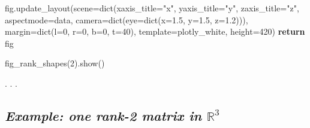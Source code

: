 \documentclass[
  letterpaper,
  DIV=11,
  numbers=noendperiod]{scrartcl}
\newenvironment{Shaded}{\begin{snugshade}}{\end{snugshade}}
\newcommand{\BuiltInTok}[1]{\textcolor[rgb]{0.00,0.23,0.31}{#1}}
\newcommand{\ControlFlowTok}[1]{\textcolor[rgb]{0.00,0.23,0.31}{\textbf{#1}}}
\newcommand{\DecValTok}[1]{\textcolor[rgb]{0.68,0.00,0.00}{#1}}
\newcommand{\FloatTok}[1]{\textcolor[rgb]{0.68,0.00,0.00}{#1}}
\newcommand{\NormalTok}[1]{\textcolor[rgb]{0.00,0.23,0.31}{#1}}
\newcommand{\OperatorTok}[1]{\textcolor[rgb]{0.37,0.37,0.37}{#1}}
\newcommand{\StringTok}[1]{\textcolor[rgb]{0.13,0.47,0.30}{#1}}
\begin{document}
\begin{Shaded}
\begin{Highlighting}[]
\NormalTok{    fig.update\_layout(scene}\OperatorTok{=}\BuiltInTok{dict}\NormalTok{(xaxis\_title}\OperatorTok{=}\StringTok{"x"}\NormalTok{, yaxis\_title}\OperatorTok{=}\StringTok{"y"}\NormalTok{, zaxis\_title}\OperatorTok{=}\StringTok{"z"}\NormalTok{,}
\NormalTok{                                 aspectmode}\OperatorTok{=}\StringTok{\textquotesingle{}data\textquotesingle{}}\NormalTok{, camera}\OperatorTok{=}\BuiltInTok{dict}\NormalTok{(eye}\OperatorTok{=}\BuiltInTok{dict}\NormalTok{(x}\OperatorTok{=}\FloatTok{1.5}\NormalTok{, y}\OperatorTok{=}\FloatTok{1.5}\NormalTok{, z}\OperatorTok{=}\FloatTok{1.2}\NormalTok{))),}
\NormalTok{                      margin}\OperatorTok{=}\BuiltInTok{dict}\NormalTok{(l}\OperatorTok{=}\DecValTok{0}\NormalTok{, r}\OperatorTok{=}\DecValTok{0}\NormalTok{, b}\OperatorTok{=}\DecValTok{0}\NormalTok{, t}\OperatorTok{=}\DecValTok{40}\NormalTok{), template}\OperatorTok{=}\StringTok{\textquotesingle{}plotly\_white\textquotesingle{}}\NormalTok{, height}\OperatorTok{=}\DecValTok{420}\NormalTok{)}
    \ControlFlowTok{return}\NormalTok{ fig}

\NormalTok{fig\_rank\_shapes(}\DecValTok{2}\NormalTok{).show()}
\end{Highlighting}
\end{Shaded}

\begin{figure}


\caption{\label{fig-rank-shapes}}

\end{figure}%

. . .

\subsection{\texorpdfstring{\emph{Example: one rank-2 matrix in
\(\mathbb{R}^3\)}}{Example: one rank-2 matrix in \textbackslash mathbb\{R\}\^{}3}}\label{example-one-rank-2-matrix-in-mathbbr3}
\end{document}
